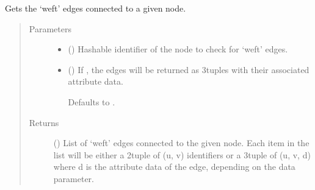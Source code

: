 \documentclass[letterpaper,10pt,english]{sphinxmanual}
\begin{document}
\begin{fulllineitems}
\begin{fulllineitems}
\begin{quote}
\begin{description}
\end{description}\end{quote}

\end{fulllineitems}


\begin{fulllineitems}
\label{\detokenize{cockatoo:cockatoo.KnitNetworkBase.node_weft_edges}}
Gets the ‘weft’ edges connected to a given node.
\begin{quote}\begin{description}
\item[{Parameters}] \leavevmode\begin{itemize}
\item {} 
 () \textendash{} Hashable identifier of the node to check for ‘weft’ edges.

\item {} 
 (\sphinxstyleliteralemphasis{\sphinxupquote{, }}) \textendash{} 
If , the edges will be returned as 3\sphinxhyphen{}tuples with their
associated attribute data.

Defaults to .


\end{itemize}

\item[{Returns}] \leavevmode
{} () \textendash{} List of ‘weft’ edges connected to the given node. Each item in the
list will be either a 2\sphinxhyphen{}tuple of (u, v) identifiers or a 3\sphinxhyphen{}tuple
of (u, v, d) where d is the attribute data of the edge, depending
on the data parameter.

\end{description}\end{quote}

\end{fulllineitems}


\end{fulllineitems}
\end{document}

